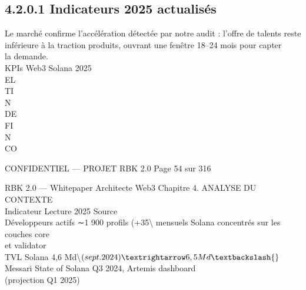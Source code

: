 \documentclass[12pt,landscape,a4paper]{article}
\newenvironment{confidential}
{\begin{tcolorbox}[
    colback=rbkred!5!white,
    colframe=rbkred!75!black,
    title=CONFIDENTIEL,
    fonttitle=\bfseries\color{white},
    coltitle=rbkred!75!black,
    breakable,
    enhanced,
    frame hidden,
    borderline west={2pt}{0pt}{rbkred!75!black}
]}
{\end{tcolorbox}}
\begin{document}
\subsection{4.2.0.1 Indicateurs 2025 actualisés}
Le marché confirme l’accélération détectée par notre audit : l’offre de talents reste inférieure à la traction produits, ouvrant une fenêtre 18–24 mois pour capter\\
la demande.\\
\vspace{0.5em}
KPIs Web3 Solana 2025\\
\vspace{0.5em}
\vspace{0.5em}
\vspace{0.5em}
\vspace{0.5em}
EL\\
TI\\
N\\
DE\\
FI\\
N\\
CO\\
\vspace{0.5em}
\vspace{0.5em}
\vspace{0.5em}
\vspace{0.5em}
\begin{confidential}CONFIDENTIEL — PROJET RBK 2.0                                             Page 54 sur 316\end{confidential}
RBK 2.0 — Whitepaper Architecte Web3                                                                                  Chapitre 4. ANALYSE DU CONTEXTE\\
\vspace{0.5em}
\vspace{0.5em}
\vspace{0.5em}
Indicateur                    Lecture 2025                      Source\\
Développeurs actifs           ∼1 900 profils (+35\textbackslash{}%
mensuels Solana               concentrés sur les couches core\\
et validator\\
TVL Solana                    4,6 Md\textbackslash{}$ (sept. 2024) → 6,5 Md\textbackslash{}$ Messari State of Solana Q3 2024, Artemis dashboard\\
(projection Q1 2025)\\
\end{document}
